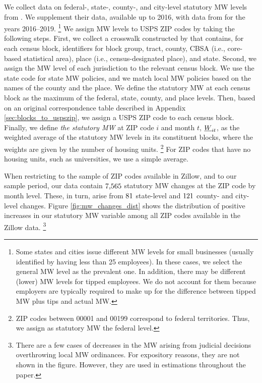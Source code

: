 We collect data on federal-, state-, county-, and city-level statutory MW levels 
from \textcite{VaghulZipperer2016}.
We supplement their data, available up to 2016, with data from 
\textcite{BerkeleyLaborCenter} for the years 2016--2019.%
\footnote{Some states and cities issue different MW levels for small businesses
(usually identified by having less than 25 employees).
In these cases, we select the general MW level as the prevalent one.
In addition, there may be different (lower) MW levels for tipped employees.
We do not account for them because employers are typically required to make up 
for the difference between tipped MW plus tips and actual MW.}
We assign MW levels to USPS ZIP codes by taking the following steps.
First, we collect a crosswalk constructed by \parencite{CensusLODES} that contains,
for each census block, identifiers for block group, tract, county, CBSA 
(i.e., core-based statistical area), place (i.e., census-designated place), and state.
Second, we assign the MW level of each jurisdiction to the relevant census block.
We use the state code for state MW policies, and we match local MW policies 
based on the names of the county and the place.
We define the statutory MW at each census block as the maximum of the federal,
state, county, and place levels.
Then, based on an original correspondence table described in Appendix 
\ref{sec:blocks_to_uspszip}, we assign a USPS ZIP code to each census
block.
Finally, we define \textit{the statutory MW} at ZIP code $i$ and month $t$, $\underline{W}_{it}$, 
as the weighted average of the statutory MW levels in its constituent blocks, 
where the weights are given by the number of housing units.%
\footnote{ZIP codes between 00001 and 00199 correspond to federal territories.
Thus, we assign as statutory MW the federal level.}
For ZIP codes that have no housing units, such as universities,
we use a simple average.

When restricting 
to the sample of ZIP codes available in Zillow, and 
to our sample period, our data contain
$\textnormal{7,565}$ statutory MW changes at the ZIP code by month level.
These, in turn, arise from 
$\textnormal{81}$ state-level and 
$\textnormal{121}$ county- and city-level changes.
Figure \ref{fig:mw_changes_dist} shows the distribution of positive increases in
our statutory MW variable among all ZIP codes available in the Zillow data.%
\footnote{There are a few cases of decreases in the MW arising from judicial 
decisions overthrowing local MW ordinances.
For expository reasons, they are not shown in the figure.
However, they are used in estimations throughout the paper.}

